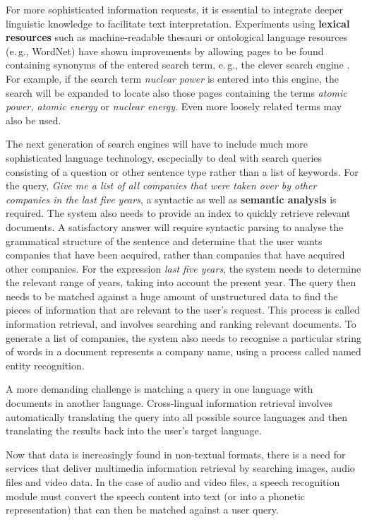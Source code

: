 \documentclass[]{../../metanetpaper}
\begin{document}
\begin{multicols}{2}
For more sophisticated information requests, it is essential to integrate deeper linguistic knowledge to facilitate text interpretation. Experiments using \textbf{lexical resources} such as machine-readable thesauri or ontological language resources (e.\,g., WordNet) have shown improvements by allowing pages to be found containing synonyms of the entered search term, e.\,g., the clever search engine \cite{clev}. For example, if the search term \textit{nuclear power} is entered into this engine, the search will be expanded to locate also those pages containing the terms \textit{atomic power, atomic energy} or \textit{nuclear energy}. Even more loosely related terms may also be used.


The next generation of search engines will have to include much more sophisticated language technology, escpecially to deal with search queries consisting of a question or other sentence type rather than a list of keywords. For the query, \textit{Give me a list of all companies that were taken over by other companies in the last five years}, a syntactic as well as \textbf{semantic analysis} is required. The system also needs to provide an index to quickly retrieve relevant documents. A satisfactory answer will require syntactic parsing to analyse the grammatical structure of the sentence and determine that the user wants companies that have been acquired, rather than companies that have acquired other companies. For the expression \textit{last five years}, the system needs to determine the relevant range of years, taking into account the present year. The query then needs to be matched against a huge amount of unstructured data to find the pieces of information that are relevant to the user’s request. This process is called information retrieval, and involves searching and ranking relevant documents. To generate a list of companies, the system also needs to recognise a particular string of words in a document represents a company name, using a process called named entity recognition.

A more demanding challenge is matching a query in one language with documents in another language. Cross-lingual information retrieval involves automatically translating the query into all possible source languages and then translating the results back into the user's target language.

Now that data is increasingly found in non-textual formats, there is a need for services that deliver multimedia information retrieval by searching images, audio files and video data. In the case of audio and video files, a speech recognition module must convert the speech content into text (or into a phonetic representation) that can then be matched against a user query.


\end{multicols}
\end{document}
